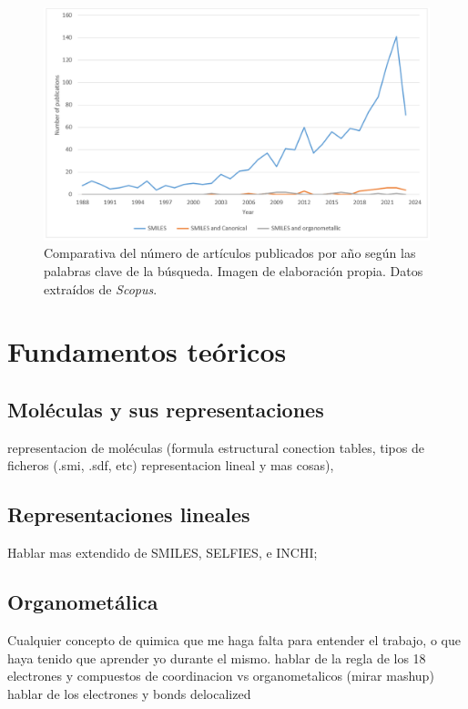\begin{figure}[h!]
        \centering
        \includegraphics[scale=0.5]{imagenes/estado_arte/revisionBibliografica.png}
        \caption{Comparativa del número de artículos publicados por año según las palabras clave de la búsqueda. Imagen de elaboración propia. Datos extraídos de \emph{Scopus}.}
        \label{fig:revisionBibliografica}
    \end{figure}


\section{Fundamentos teóricos}

\subsection{Moléculas y sus representaciones}
representacion de moléculas (formula estructural conection tables, tipos de ficheros (.smi, .sdf, etc) representacion lineal y mas cosas),

\subsection{Representaciones lineales} \label{teoria:representaciones_lineales}
Hablar mas extendido de SMILES, SELFIES, e INCHI;

\subsection{Organometálica} \label{teoria:ogm}
Cualquier concepto de quimica que me haga falta para entender el trabajo, o que haya tenido que aprender yo durante el mismo.
hablar de la regla de los 18 electrones y compuestos de coordinacion vs organometalicos
(mirar mashup)
hablar de los electrones y bonds delocalized

